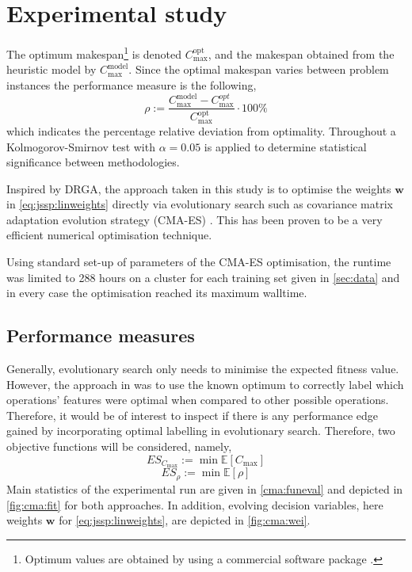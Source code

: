 \documentclass[graybox]{svmult}
\renewcommand{\vec}[1]{\mathbf{#1}}
\newcommand{\Exp}{{\mathbb E}}
\begin{document}
\section{Experimental study}\label{sec:expr}
The optimum makespan\footnote{Optimum values are obtained by using a commercial 
software package \cite{gurobi}.} is denoted $C_{\max}^{\text{opt}}$, and the 
makespan obtained from the heuristic model by $C_{\max}^{\text{model}}$. Since 
the optimal makespan varies between problem instances the performance measure 
is the following, 
\begin{equation}\label{eq:ratio}
\rho := \frac{C_{\max}^{\text{model}}-C_{\max}^{opt}}{C_{\max}^{\text{opt}}} 
\cdot 100\%
\end{equation}
which indicates the percentage relative deviation from optimality. Throughout a 
Kolmogorov-Smirnov test with $\alpha=0.05$ is applied to determine statistical 
significance between methodologies. 

Inspired by DRGA, the approach taken in this study is to optimise the weights 
$\vec{w}$ in \cref{eq:jssp:linweights} directly via evolutionary search such as 
covariance matrix adaptation evolution strategy (CMA-ES) \cite{Hansen01}. This 
has been proven to be a very efficient numerical optimisation technique. 

Using standard set-up of parameters of the CMA-ES optimisation, the runtime was 
limited to 288 hours on a cluster for each training set given in 
\cref{sec:data} and in every case the optimisation reached its maximum walltime.

\subsection{Performance measures}\label{sec:expr:measure}
Generally, evolutionary search only needs to minimise the expected fitness 
value. However, the  approach in \cite{InRu11a} was to use the known optimum to 
correctly label which operations' features were optimal when compared to other 
possible operations. Therefore, it would be of interest to inspect if there is 
any performance edge gained by incorporating optimal labelling in evolutionary 
search. Therefore, two objective functions will be considered, namely, 
\begin{equation}
ES_{C_{\max}} := \min \Exp[C_{\max}] \label{eq:cma:makespan}
\end{equation}
\begin{equation}
ES_{\rho} := \min \Exp[\rho] \label{eq:cma:rho}
\end{equation} 
Main statistics of the experimental run are given in \cref{cma:funeval} and 
depicted in \cref{fig:cma:fit} for both approaches. In addition, evolving 
decision variables, here weights $\vec{w}$ for \cref{eq:jssp:linweights}, are 
depicted in \cref{fig:cma:wei}. 
\end{document}
